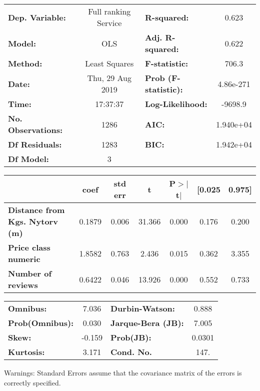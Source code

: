\documentclass{report}
\begin{document}
\begin{center}
\begin{tabular}{lclc}
\toprule
\textbf{Dep. Variable:}                & Full ranking Service & \textbf{  R-squared:         } &     0.623   \\
\textbf{Model:}                        &         OLS          & \textbf{  Adj. R-squared:    } &     0.622   \\
\textbf{Method:}                       &    Least Squares     & \textbf{  F-statistic:       } &     706.3   \\
\textbf{Date:}                         &   Thu, 29 Aug 2019   & \textbf{  Prob (F-statistic):} & 4.86e-271   \\
\textbf{Time:}                         &       17:37:37       & \textbf{  Log-Likelihood:    } &   -9698.9   \\
\textbf{No. Observations:}             &          1286        & \textbf{  AIC:               } & 1.940e+04   \\
\textbf{Df Residuals:}                 &          1283        & \textbf{  BIC:               } & 1.942e+04   \\
\textbf{Df Model:}                     &             3        & \textbf{                     } &             \\
\bottomrule
\end{tabular}
\begin{tabular}{lcccccc}
                                       & \textbf{coef} & \textbf{std err} & \textbf{t} & \textbf{P$>$$|$t$|$} & \textbf{[0.025} & \textbf{0.975]}  \\
\midrule
\textbf{Distance from Kgs. Nytorv (m)} &       0.1879  &        0.006     &    31.366  &         0.000        &        0.176    &        0.200     \\
\textbf{Price class numeric}           &       1.8582  &        0.763     &     2.436  &         0.015        &        0.362    &        3.355     \\
\textbf{Number of reviews}             &       0.6422  &        0.046     &    13.926  &         0.000        &        0.552    &        0.733     \\
\bottomrule
\end{tabular}
\begin{tabular}{lclc}
\textbf{Omnibus:}       &  7.036 & \textbf{  Durbin-Watson:     } &    0.888  \\
\textbf{Prob(Omnibus):} &  0.030 & \textbf{  Jarque-Bera (JB):  } &    7.005  \\
\textbf{Skew:}          & -0.159 & \textbf{  Prob(JB):          } &   0.0301  \\
\textbf{Kurtosis:}      &  3.171 & \textbf{  Cond. No.          } &     147.  \\
\bottomrule
\end{tabular}
\end{center}

Warnings: \newline
 [1] Standard Errors assume that the covariance matrix of the errors is correctly specified.
\end{document}

